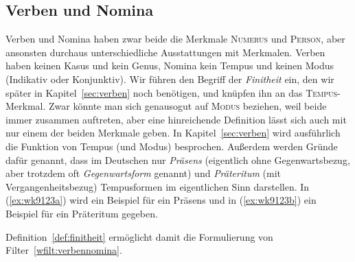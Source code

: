 
\Stretch[2]

\subsection{Verben und Nomina}

\label{sec:verbennominawortklassen}


Verben und Nomina haben zwar beide die Merkmale \textsc{Numerus} und \textsc{Person}, aber ansonsten durchaus unterschiedliche Ausstattungen mit Merkmalen.
Verben haben keinen Kasus und kein Genus, Nomina kein Tempus und keinen Modus (Indikativ oder Konjunktiv).
Wir führen den Begriff der \textit{Finitheit} ein, den wir später in Kapitel~\ref{sec:verben} noch benötigen, und knüpfen ihn an das \textsc{Tempus}-Merkmal.
Zwar könnte man sich genausogut auf \textsc{Modus} beziehen, weil beide immer zusammen auftreten, aber eine hinreichende Definition lässt sich auch mit nur einem der beiden Merkmale geben.
In Kapitel~\ref{sec:verben} wird ausführlich die Funktion von Tempus (und Modus) besprochen.
Außerdem werden Gründe dafür genannt, dass im Deutschen nur \textit{Präsens} (eigentlich ohne Gegenwartsbezug, aber trotzdem oft \textit{Gegenwartsform} genannt) und \textit{Präteritum} (mit Vergangenheitsbezug) Tempusformen im eigentlichen Sinn darstellen.
In (\ref{ex:wk9123a}) wird ein Beispiel für ein Präsens und in (\ref{ex:wk9123b}) ein Beispiel für ein Präteritum gegeben.

\begin{exe}
  \ex\label{ex:wk9123}
  \begin{xlist}
  \end{xlist}
\end{exe}

Definition~\ref{def:finitheit} ermöglicht damit die Formulierung von Filter~\ref{wfilt:verbennomina}.

\Np



